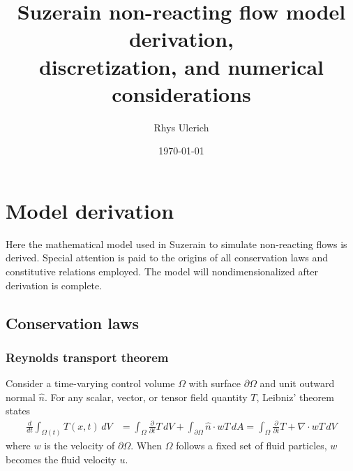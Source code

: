 \documentclass[letterpaper,11pt,nointlimits,reqno,draft]{amsbook}
\begin{document}
\frontmatter
\title{Suzerain non-reacting flow model derivation,\\
       discretization, and numerical considerations}
\author{Rhys Ulerich}
\address{Institute for Computational Engineering and Sciences\\
         The University of Texas at Austin}
\date{\today}
\maketitle
\renewcommand{\contentsname}{} %
\setcounter{tocdepth}{4}
\let\oldtocsection=\tocsection
\let\oldtocsubsection=\tocsubsection
\let\oldtocsubsubsection=\tocsubsubsection
\renewcommand{\tocsection}[2]{\hspace{0em}\oldtocsection{#1}{#2}}
\renewcommand{\tocsubsection}[2]{\hspace{1em}\oldtocsubsection{#1}{#2}}
\renewcommand{\tocsubsubsection}[2]{\hspace{2em}\oldtocsubsubsection{#1}{#2}}
\tableofcontents
\mainmatter

\chapter{Model derivation}
\label{sec:derivation}

Here the mathematical model used in Suzerain to simulate non-reacting flows is
derived.  Special attention is paid to the origins of all conservation laws and
constitutive relations employed.  The model will nondimensionalized after
derivation is complete.

\section{Conservation laws}

\subsection{Reynolds transport theorem}

Consider a time-varying control volume $\Omega$ with surface
$\partial\Omega$ and unit outward normal $\hat{n}$.  For any
scalar, vector, or tensor field quantity
$T$, Leibniz' theorem states
\begin{align}
  \label{eq:rtt}
  \frac{d}{dt}\int_{\Omega(t)}T(x,t)\,dV
  &=
  \int_{\Omega}\frac{\partial}{\partial{}t}T\,dV
  +
  \int_{\partial\Omega} \hat{n}\cdot{}w T\,dA
  =
  \int_{\Omega}\frac{\partial}{\partial{}t}T+\nabla\cdot{}wT\,dV
\end{align}
where $w$ is the velocity of $\partial\Omega$.  When $\Omega$ follows
a fixed set of fluid particles, $w$ becomes the fluid velocity $u$.
\end{document}

